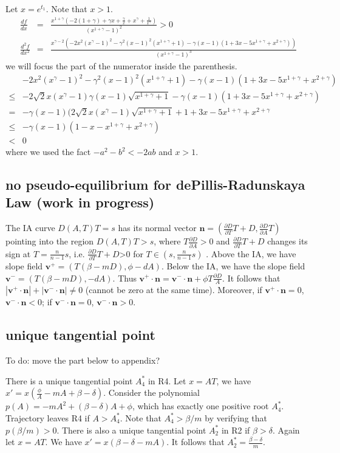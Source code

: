 \documentclass[review,authoryear]{elsarticle}
\begin{document}
Let $x=e^{t_{1}}$. Note that $x>1$. 
\begin{eqnarray*}
\frac{df}{dx} & = & \frac{x^{1+\gamma}(-2(1+\gamma)+\gamma x+\frac{\gamma}{x}+x^{\gamma}+\frac{1}{x^{\gamma}})}{(x^{1+\gamma}-1)^{2}}>0\\
\frac{d^{2}f}{dx^{2}} & = & \frac{x^{\gamma-2}(-2x^{2}(x^{\gamma}-1)^{2}-\gamma^{2}(x-1)^{2}(x^{1+\gamma}+1)-\gamma(x-1)(1+3x-5x^{1+\gamma}+x^{2+\gamma}))}{(x^{1+\gamma}-1)^{3}}
\end{eqnarray*}
we will focus the part of the numerator inside the parenthesis. 
\begin{align*}
 & -2x^{2}(x^{\gamma}-1)^{2}-\gamma^{2}(x-1)^{2}(x^{1+\gamma}+1)-\gamma(x-1)(1+3x-5x^{1+\gamma}+x^{2+\gamma})\\
\le & -2\sqrt{2}x(x^{\gamma}-1)\gamma(x-1)\sqrt{x^{1+\gamma}+1}-\gamma(x-1)(1+3x-5x^{1+\gamma}+x^{2+\gamma})\\
= & -\gamma(x-1)(2\sqrt{2}x(x^{\gamma}-1)\sqrt{x^{1+\gamma}+1}+1+3x-5x^{1+\gamma}+x^{2+\gamma}\\
\le & -\gamma(x-1)(1-x-x^{1+\gamma}+x^{2+\gamma})\\
< & 0
\end{align*}
where we used the fact $-a^{2}-b^{2}<-2ab$ and $x>1$. 

\subsection*{no pseudo-equilibrium for dePillis-Radunskaya Law (work in progress)}

The IA curve $D(A,T)T=s$ has its normal vector $\mathbf{n}=(\frac{\partial D}{\partial T}T+D,\frac{\partial D}{\partial A}T)$
pointing into the region $D(A,T)T>s$, where $T\frac{\partial D}{\partial A}>0$
and $\frac{\partial D}{\partial T}T+D$ changes its sign at $T=\frac{n}{n-1}s$,
i.e. $\frac{\partial D}{\partial T}T+D$\textgreater 0 for $T\in(s,\frac{n}{n-1}s)$
. Above the IA, we have slope field $\mathbf{v}^{+}=(T(\beta-mD),\phi-dA).$
Below the IA, we have the slope field $\mathbf{v}^{-}=(T(\beta-mD),-dA).$
Thus $\mathbf{v}^{+}\cdot\mathbf{n}=\mathbf{v}^{-}\cdot\mathbf{n}+\phi T\frac{\partial D}{A}$.
It follows that $|\mathbf{v}^{+}\cdot\mathbf{n}|+|\mathbf{v}^{-}\cdot\mathbf{n}|\ne0$
(cannot be zero at the same time). Moreover, if $\mathbf{v}^{+}\cdot\mathbf{n}=0$,
$\mathbf{v}^{-}\cdot\mathbf{n}<0$; if $\mathbf{v}^{-}\cdot\mathbf{n}=0$,
$\mathbf{v}^{-}\cdot\mathbf{n}>0$.

\subsection*{unique tangential point}
To do: move the part below to appendix? 

There is a unique tangential point $A_{4}^{*}$ in R4. Let $x=AT$,
we have $x'=x(\frac{\phi}{A}-mA+\beta-\delta)$. Consider the polynomial
$p(A)=-mA^{2}+(\beta-\delta)A+\phi$, which has exactly one positive
root $A_{4}^{*}$. Trajectory leaves R4 if $A>A_{4}^{*}$. Note that
$A_{4}^{*}>\beta/m$ by verifying that $p(\beta/m)>0$. There is also
a unique tangential point $A_{2}^{*}$ in R2 if $\beta>\delta$. Again
let $x=AT$. We have $x'=x(\beta-\delta-mA)$. It follows that $A_{2}^{*}=\frac{\beta-\delta}{m}$. 


\end{document}
